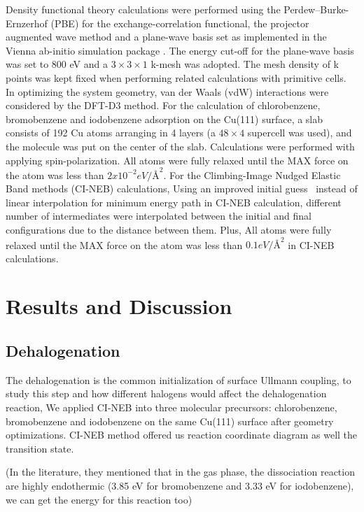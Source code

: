 \documentclass[aps,reprint,amsmath,amssymb]{revtex4-2}
\begin{document}
Density functional theory calculations were performed using the Perdew–Burke-Ernzerhof (PBE) for the exchange-correlation functional, the projector augmented wave method and a plane-wave basis set as implemented in the Vienna ab-initio simulation package . The energy cut-off for the plane-wave basis was set to 800 eV and a $3\times 3 \times1$ k-mesh was adopted. The mesh density of k points was kept fixed when performing related calculations with primitive cells. In optimizing the system geometry, van der Waals (vdW) interactions were considered by the DFT-D3 method. For the calculation of chlorobenzene, bromobenzene and iodobenzene adsorption on the Cu(111) surface, a slab consists of 192 Cu atoms arranging in 4 layers (a $48\times 4$ supercell was used), and the molecule was put on the center of the slab. Calculations were performed with applying spin-polarization. All atoms were fully relaxed until the MAX force on the atom was less than $2x10^{-2} eV/\si{\angstrom}^{2}$. 
For the Climbing-Image Nudged Elastic Band methods (CI-NEB) calculations, Using an improved initial guess~\cite{ullmann_60} instead of linear interpolation for minimum energy path in CI-NEB calculation, different number of intermediates were interpolated between the initial and final configurations due to the distance between them. Plus, All atoms were fully relaxed until the MAX force on the atom was less than $0.1 eV/\si{\angstrom}^{2}$ in CI-NEB calculations.



\section{Results and Discussion}



\subsection{Dehalogenation}

The dehalogenation is the common initialization of surface Ullmann coupling, to study this step and how different halogens would affect the dehalogenation reaction, We applied CI-NEB into three molecular precursors: chlorobenzene, bromobenzene and iodobenzene on the same Cu(111) surface after geometry optimizations. CI-NEB method offered us reaction coordinate diagram as well the transition state.

(In the literature, they mentioned that in the gas phase, the dissociation reaction are highly endothermic (3.85 eV for bromobenzene and 3.33 eV for iodobenzene), we can get the energy for this reaction too)
\end{document}
